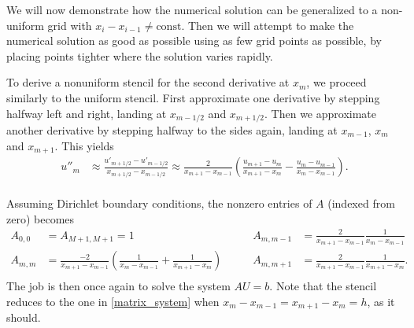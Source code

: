 \label{ex1_amr_section}

We will now demonstrate how the numerical solution can be generalized to a non-uniform grid with $x_i - x_{i-1} \neq \text{const}$.
Then we will attempt to make the numerical solution as good as possible using as few grid points as possible, by placing points tighter where the solution varies rapidly.

To derive a nonuniform stencil for the second derivative at $x_m$, we proceed similarly to the uniform stencil.
First approximate one derivative by stepping halfway left and right, landing at $x_{m-1/2}$ and $x_{m+1/2}$.
Then we approximate another derivative by stepping halfway to the sides again, landing at $x_{m-1}$, $x_{m}$ and $x_{m+1}$.
This yields
\newcommand\nonuniformstencil[4]{\frac{2}{x_{#4}-x_{#2}} \left( \frac{#1_{#4}-#1_{#3}}{x_{#4}-x_{#3}} - \frac{#1_{#3}-#1_{#2}}{x_{#3}-x_{#2}} \right)}
\begin{equation*}
\begin{split}
u''_m &\approx \frac{u'_{m+1/2} - u'_{m-1/2}}{x_{m+1/2}-x_{m-1/2}}
	  \approx \nonuniformstencil{u}{m-1}{m}{m+1}.\\
\end{split}
\label{amr_stencil}
\end{equation*}

\newcommand\hleft{x_m-x_{m-1}}
\newcommand\hright{x_{m+1}-x_m}
\newcommand\hfull{x_{m+1}-x_{m-1}}
Assuming Dirichlet boundary conditions, the nonzero entries of $A$ (indexed from zero) becomes
\begin{equation*}
\begin{aligned}
A_{0,0} &= A_{M+1, M+1} = 1
\qquad
&A_{m,m-1}       &= \frac{2}{\hfull} \frac{1}{\hleft} \\
A_{m,m  }       &= \frac{-2}{\hfull} \left( \frac{1}{\hleft} + \frac{1}{\hright} \right)
\qquad
&A_{m,m+1}       &= \frac{2}{\hfull} \frac{1}{\hright}.\\
\end{aligned}
\end{equation*}
The job is then once again to solve the system $A U = b$.
Note that the stencil reduces to the one in \cref{matrix_system} when $\hleft = \hright = h$, as it should.

